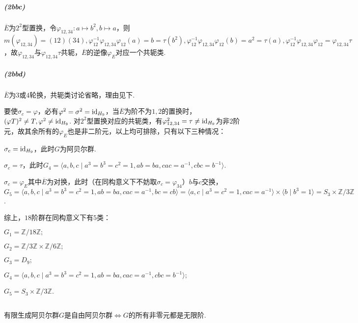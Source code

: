 \subparagraph{(2bbc)}
$\overline{E}$为$2^2$型置换，令$\varphi_{12,34}: a\mapsto b^2, b\mapsto a$，则$m(\varphi_{12,34})=(12)(34),
\varphi_{12}^{-1}\varphi_{12,34}\varphi_{12}(a)=b=\tau(b^2),
\varphi_{12}^{-1}\varphi_{12,34}\varphi_{12}(b)=a^2=\tau(a),
\varphi_{12}^{-1}\varphi_{12,34}\varphi_{12}=\varphi_{12,34}\tau$，故$\varphi_{12,34}$与$\varphi_{12,34}\tau$共轭，$\overline{E}$的逆像$\varphi_E$对应一个共轭类.

\subparagraph{(2bbd)}
$\overline{E}$为$3$或$4$轮换，共轭类讨论省略，理由见下.

要使$\sigma_c=\varphi$，必有$\varphi^2=\sigma^2=\operatorname{id}_{H_9}$，当$\overline{E}$为阶不为$1,2$的置换时，$(\varphi T)^2\neq T, \varphi^2\neq \operatorname{id}_{H_9}$. 对$2^2$型置换对应的共轭类，有$\varphi_{12,34}^2=\tau\neq\operatorname{id}_{H_9}$为非$2$阶元，故其余所有的$\varphi_E$也是非二阶元，以上均可排除，只有以下三种情况：

$\sigma_c=\operatorname{id}_{H_9}$，此时$G$为阿贝尔群.

$\sigma_c=\tau$，此时$G_4=\langle a,b,c\mid a^3=b^3=c^2=1, ab=ba, cac=a^{-1}, cbc=b^{-1}\rangle$.

$\sigma_c=\varphi_E$其中$\overline{E}$为对换，此时（在同构意义下不妨取$\sigma_c=\varphi_{34}$）$b$与$c$交换，$G_5=\langle a,b,c\mid a^3=b^3=c^2=1, ab=ba, cac=a^{-1}, bc=cb\rangle=\langle a,c\mid a^3=c^2=1, cac=a^{-1}\rangle \times \langle b\mid b^3=1\rangle
=S_3\times \mathbb{Z}/3\mathbb{Z}$.

综上，$18$阶群在同构意义下有$5$类：

$G_1=\mathbb{Z}/18\mathbb{Z};$

$G_2=\mathbb{Z}/3\mathbb{Z}\times\mathbb{Z}/6\mathbb{Z};$

$G_3=D_9;$

$G_4=\langle a,b,c\mid a^3=b^3=c^2=1, ab=ba, cac=a^{-1}, cbc=b^{-1}\rangle;$

$G_5=S_3\times \mathbb{Z}/3\mathbb{Z}$.

\subsection{}
有限生成阿贝尔群$G$是自由阿贝尔群$\Leftrightarrow G$的所有非零元都是无限阶.


\subsection{}
